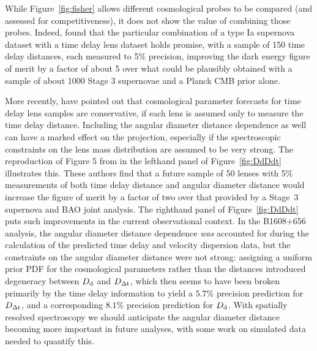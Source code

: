 While Figure~\ref{fig:fisher} allows different cosmological probes to
be compared (and assessed for competitiveness), it does not show the
value of combining those probes. Indeed, \citet{Lin11} found that the
particular combination of a type Ia supernova dataset with a time  delay
lens dataset holds promise, with a sample of 150 time delay distances,
each measured to 5\% precision, improving the dark energy figure of
merit by a factor of about 5 over what could be  plausibly obtained with
a sample of about 1000 Stage 3 supernovae and a Planck CMB prior alone.

More recently, \citet{JeeKomatsuSuyu2015} have pointed out that
cosmological parameter forecasts for time delay lens samples are
conservative, if each lens is assumed only to measure the time delay
distance. Including the angular diameter distance dependence as well can
have a marked effect on the projection, especially if the spectroscopic
constraints on the lens mass distribution are assumed to be very strong.
The reproduction of Figure 5 from
\citet{JeeEtal2016} in the lefthand panel of Figure~\ref{fig:DdDdt}
illustrates this. These authors find that a future sample of
50 lenses
with 5\% measurements of both time delay distance and angular diameter
distance would increase the figure of merit by a factor of two over that
provided by a Stage~3 supernova and BAO joint analysis. The righthand
panel of Figure~\ref{fig:DdDdt} puts such improvements in the  current
observational context. In the B1608$+$656 analysis, the  angular
diameter distance dependence {\it was} accounted for during the
calculation of the predicted time delay and velocity dispersion data,
but the constraints on the angular diameter distance were not strong:
assigning a uniform prior PDF for the cosmological parameters rather
than the distances introduced degeneracy between $D_{\rm d}$ and $D_{\Delta{\rm t}}$,
which then seems to have been broken primarily by the time delay
information to yield a $5.7\%$ precision prediction for $D_{\Delta{\rm t}}$, and
a corresponding $8.1\%$ precision prediction for $D_{\rm d}$.
With spatially resolved spectroscopy we should anticipate the angular
diameter distance becoming more important in future analyses, with
some work on simulated data needed to quantify this.


